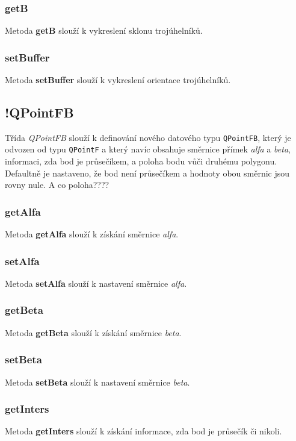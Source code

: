 \documentclass[a4paper, 12pt]{article}
\begin{document}
\subsubsection*{getB}
Metoda \textbf{getB} slouží k vykreslení sklonu trojúhelníků.

\subsubsection*{setBuffer}
Metoda \textbf{setBuffer} slouží k vykreslení orientace trojúhelníků.


\subsection{!QPointFB}
Třída \textit{QPointFB} slouží k definování nového datového typu \texttt{QPointFB}, který je odvozen od typu \texttt{QPointF} a který navíc obsahuje směrnice přímek \textsl{alfa} a \textsl{beta}, informaci, zda bod je průsečíkem, a poloha bodu vůči druhému polygonu. Defaultně je nastaveno, že bod není průsečíkem a hodnoty obou směrnic jsou rovny nule. A co poloha????

\subsubsection*{getAlfa}
Metoda \textbf{getAlfa} slouží k získání směrnice \textsl{alfa}.

\subsubsection*{setAlfa}
Metoda \textbf{setAlfa} slouží k nastavení směrnice \textsl{alfa}. 

\subsubsection*{getBeta}
Metoda \textbf{getBeta} slouží k získání směrnice \textsl{beta}.

\subsubsection*{setBeta}
Metoda \textbf{setBeta} slouží k nastavení směrnice \textsl{beta}. 

\subsubsection*{getInters}
Metoda \textbf{getInters} slouží k získání informace, zda bod je průsečík či nikoli.
\end{document}
